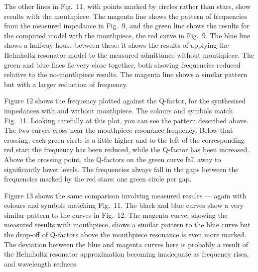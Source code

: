 
  The other lines in Fig.\ 11, with points marked by circles rather than stars, 
  show results with the mouthpiece. The magenta line shows the pattern of 
  frequencies from the measured impedance in Fig.\ 9, and the green line shows 
  the results for the computed model with the mouthpiece, the red curve in 
  Fig.\ 9. The blue line shows a halfway house between these: it shows the 
  results of applying the Helmholtz resonator model to the measured admittance 
  without mouthpiece. The green and blue lines lie very close together, both 
  showing frequencies reduced relative to the no-mouthpiece results. The 
  magenta line shows a similar pattern but with a larger reduction of 
  frequency. 

  Figure 12 shows the frequency plotted against the Q-factor, for the 
  synthesised impedances with and without mouthpiece. The colours and symbols 
  match Fig.\ 11. Looking carefully at this plot, you can see the pattern 
  described above. The two curves cross near the mouthpiece resonance 
  frequency. Below that crossing, each green circle is a little higher and to 
  the left of the corresponding red star: the frequency has been reduced, while 
  the Q-factor has been increased. Above the crossing point, the Q-factors on 
  the green curve fall away to significantly lower levels. The frequencies 
  always fall in the gaps between the frequencies marked by the red stars: one 
  green circle per gap. 


  Figure 13 shows the same comparison involving measured results — again with 
  colours and symbols matching Fig.\ 11. The black and blue curves show a very 
  similar pattern to the curves in Fig.\ 12. The magenta curve, showing the 
  measured results with mouthpiece, shows a similar pattern to the blue curve 
  but the drop-off of Q-factors above the mouthpiece resonance is even more 
  marked. The deviation between the blue and magenta curves here is probably a 
  result of the Helmholtz resonator approximation becoming inadequate as 
  frequency rises, and wavelength reduces. 

